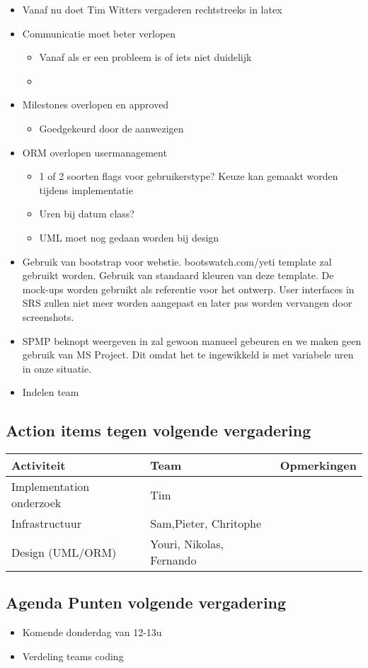 \begin{itemize}
	\item Vanaf nu doet Tim Witters vergaderen rechtstreeks in latex
	\item Communicatie moet beter verlopen 
		\begin{itemize}
			\item Vanaf als er een probleem is of iets niet duidelijk
			\item
		\end{itemize}
	\item Milestones overlopen en approved
		\begin{itemize}
			\item Goedgekeurd door de aanwezigen
		\end{itemize}
	\item ORM overlopen usermanagement
		\begin{itemize}
			\item 1 of 2 soorten flags voor gebruikerstype? Keuze kan gemaakt worden tijdens implementatie
			\item Uren bij datum class?
			\item UML moet nog gedaan worden bij design
		\end{itemize}
	\item Gebruik van bootstrap voor webstie. bootswatch.com/yeti template zal gebruikt worden. Gebruik van standaard kleuren van deze template. De mock-ups worden gebruikt als referentie voor het ontwerp. User interfaces in SRS zullen niet meer worden aangepast en later pas worden vervangen door screenshots.
	\item SPMP beknopt weergeven in zal gewoon manueel gebeuren en we maken geen gebruik van MS Project. Dit omdat het te ingewikkeld is met variabele uren in onze situatie.
	\item Indelen team
\end{itemize}



\subsection{Action items tegen volgende vergadering}
\begin{table} [H]
	\centering
	\begin{tabular} {l|l|l}
		\textbf{Activiteit} & \textbf{Team} & \textbf{Opmerkingen} \\
		\hline
		Implementation onderzoek & Tim & \\
		Infrastructuur & Sam,Pieter, Chritophe & \\
		Design (UML/ORM) & Youri, Nikolas, Fernando & \\
	\end{tabular}
\end{table}

\subsection{Agenda Punten volgende vergadering}
	\begin{itemize}
		\item Komende donderdag van 12-13u
		\item Verdeling teams coding
	\end{itemize}


